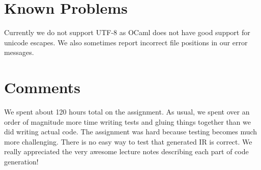 \documentclass{hw}
\begin{document}
\section{Known Problems}\label{sec:problems}
Currently we do not support UTF-8 as OCaml does not have good support for
unicode escapes. We also sometimes report incorrect file positions in our error
messages.

\section{Comments}\label{sec:comments}
We spent about 120 hours total on the assignment. As usual, we spent over an
order of magnitude more time writing tests and gluing things together than we
did writing actual code. The assignment was hard because testing becomes much
more challenging. There is no easy way to test that generated IR is correct. We
really appreciated the very awesome lecture notes describing each part of code
generation!
\end{document}
